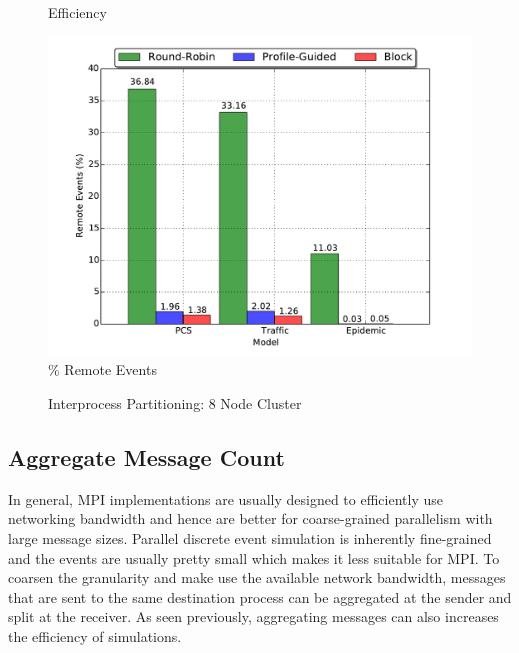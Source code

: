 \documentclass[11pt]{book}
\begin{document}
\begin{figure}
\begin{minipage}{.5\textwidth}
\begin{center}
      Efficiency \\
    \end{center}
  \end{minipage}
  \centering
  \begin{minipage}{.5\textwidth}
    \begin{center}
      \includegraphics[width=\textwidth,keepaspectratio,quiet]{figs/partitioning_communication/partitioning_premote_8node.pdf} \\
      \% Remote Events \\
    \end{center}
  \end{minipage}
  \caption{Interprocess Partitioning: 8 Node Cluster}\label{partitioning_8node}
\end{figure}

\subsection{Aggregate Message Count}

In general, MPI implementations are usually designed to efficiently use networking bandwidth
and hence are better for coarse-grained parallelism with large message sizes.  Parallel discrete
event simulation is inherently fine-grained and the events are usually pretty small which makes
it less suitable for MPI.  To coarsen the granularity and make use the available network bandwidth,
messages that are sent to the same destination process can be aggregated at the sender and
split at the receiver.  As seen previously, aggregating messages can also increases the efficiency
of simulations.
\end{document}

